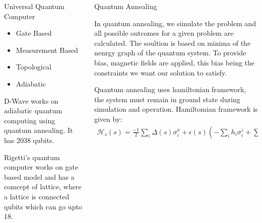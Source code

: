 \documentclass[final]{beamer}
\newlength{\onecolwid}
\newlength{\twocolwid}
\begin{document}
\begin{frame}[t]
\begin{columns}[t]
\begin{column}{\twocolwid}
\begin{columns}[t,totalwidth=\twocolwid]
\begin{column}{\onecolwid}
\begin{block}{Universal Quantum Computer}
\begin{itemize}
\item Gate Based
\item Measurement Based
\item Topological
\item Adiabatic
\end{itemize}

D-Wave works on adiabatic quantum computing using quantum annealing. It has 2038 qubits. 

Rigetti's quantum computer works on gate based model and has a comcept of lattice, where a lattice is connected qubits which can go upto 18. 



\end{block}


\end{column} %

\begin{column}{\onecolwid}\vspace{-.6in} %


\begin{block}{Quantum Annealing}

In quantum annealing, we simulate the problem and all possible outcomes for a given problem are calculated. The soultion is based on minima of the nenrgy graph of the quantum system. To provide bias, magnetic fields are applied, this bias being the constraints we want our solution to satisfy.

Quantum annealing uses hamiltonian framework, the system must remain in ground state during simulation and operation. Hamiltomian framework is given by:
\begin{multline*}
    \mathcal{H}_s(s) = \frac{-1}{2} \sum_i \Delta (s) \sigma_i^x   + \epsilon(s) ( - \sum_i h_i \sigma_i^z + \sum_{i<j} J_{ij}  \sigma_i^z \sigma_j^z)
\end{multline*}


\end{block}



\end{column}
\end{columns}
\end{column}
\end{columns}
\end{frame}
\end{document}
